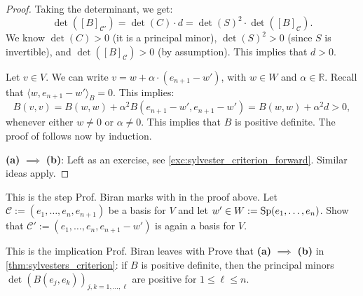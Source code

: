 \begin{proof}
Taking the determinant, we get:
\[
\det([B]_{\mathcal{C}'}) = \det(C) \cdot d = \det(S)^2 \cdot \det([B]_{\mathcal{C}}).
\]
We know $\det(C) > 0$ (it is a principal minor), $\det(S)^2 > 0$ (since $S$ is invertible), and $\det([B]_{\mathcal{C}}) > 0$ (by assumption).
This implies that $d > 0$.

Let $v \in V$. We can write $v = w + \alpha \cdot (e_{n+1} - w')$, with $w \in W$ and $\alpha \in \mathbb{R}$.
Recall that $\langle w, e_{n+1} - w' \rangle_B = 0$.
This implies:
\[
B(v, v) = B(w, w) + \alpha^2 B(e_{n+1} - w', e_{n+1} - w') = B(w, w) + \alpha^2 d > 0,
\]
whenever either $w \neq 0$ or $\alpha \neq 0$. This implies that $B$ is positive definite.
The proof of  follows now by induction.

\textbf{(a)} $\implies$ \textbf{(b)}: Left as an exercise, see \cref{exc:sylvester_criterion_forward}. Similar ideas apply.
\end{proof}

\begin{exercise}
\label{exc:shifted_family_is_basis}
This is the step Prof. Biran marks with  in the proof above. Let $\mathcal{C} := (e_1, \dots, e_n, e_{n+1})$ be a basis for $V$ and let $w' \in W := \operatorname{Sp}(e_1, \dots, e_n)$. Show that $\mathcal{C}' := (e_1, \dots, e_n, e_{n+1} - w')$ is again a basis for $V$.
\end{exercise}

\begin{exercise}
\label{exc:sylvester_criterion_forward}
This is the implication Prof. Biran leaves with  Prove that \textbf{(a)} $\implies$ \textbf{(b)} in \cref{thm:sylvesters_criterion}: if $B$ is positive definite, then the principal minors $\det(B(e_j, e_k))_{j,k = 1, \dots, \ell}$ are positive for $1 \le \ell \le n$.
\end{exercise}

